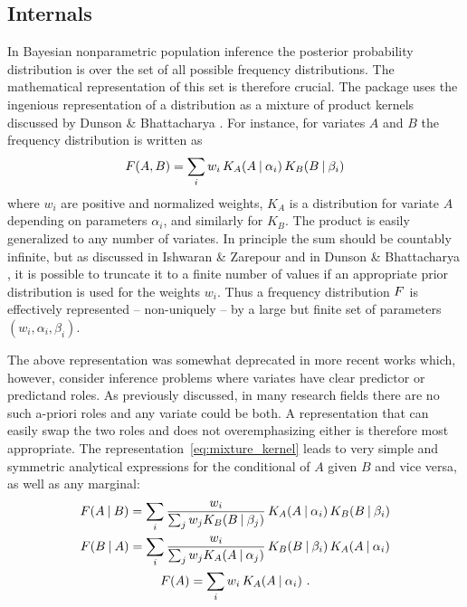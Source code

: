 \subsection*{Internals}
\label{sec:representation}

In Bayesian nonparametric population inference the posterior probability distribution is over the set of all possible frequency distributions. The mathematical representation of this set is therefore crucial. The package uses the ingenious representation of a distribution as a mixture of product kernels discussed by Dunson \& Bhattacharya \citeyear{dunsonetal2011}. For instance, for variates $A$ and $B$ the frequency distribution is written as
\begin{equation}
  \label{eq:mixture_kernel}
  \yF(A, B) = \sum_{i} w_{i}\, K_{A}(A \| \alpha_{i})\, K_{B}(B \| \beta_{i})
\end{equation}
where $w_{i}$ are positive and normalized weights, $K_{A}$ is a distribution for variate $A$ depending on parameters $\alpha_{i}$, and similarly for $K_{B}$. The product is easily generalized to any number of variates. In principle the sum should be countably infinite, but as discussed in Ishwaran \& Zarepour \citeyear{ishwaranetal2002b,ishwaranetal2002c} and in Dunson \& Bhattacharya \citeyear{dunsonetal2011}, it is possible to truncate it to a finite number of values if an appropriate prior distribution is used for the weights $w_{i}$. Thus a frequency distribution $F$ is effectively represented -- non-uniquely -- by a large but finite set of parameters $(w_{i}, \alpha_{i}, \beta_{i})$.

The above representation was somewhat deprecated in more recent works \citep[e.g.][]{wadeetal2014,wadeetal2014b} which, however, consider inference problems where variates have clear predictor or predictand roles. As previously discussed, in many research fields there are no such a-priori roles and any variate could be both. A representation that can easily swap the two roles and does not overemphasizing either is therefore most appropriate. The representation~\eqref{eq:mixture_kernel} leads to very simple and symmetric analytical expressions for the conditional of $A$ given $B$ and vice versa, as well as any marginal:
\begin{equation*}
  \begin{gathered}
    \yF(A \| B) = \sum_{i}
    \frac{w_{i}}{\sum_{j} w_{j}K_{B}(B \| \beta_{j})}\, K_{A}(A \| \alpha_{i})\, K_{B}(B \| \beta_{i})
    \\
    \yF(B \| A) = \sum_{i}
    \frac{w_{i}}{\sum_{j} w_{j}K_{A}(A \| \alpha_{j})}\, K_{B}(B \| \beta_{i})\, K_{A}(A \| \alpha_{i})
    \\
    \yF(A) = \sum_{i}
    w_{i}\, K_{A}(A \| \alpha_{i}) \ .
  \end{gathered}
\end{equation*}

